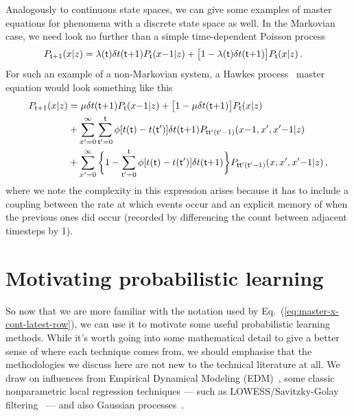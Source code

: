 Analogously to continuous state spaces, we can give some examples of master equations for phenomena with a discrete state space as well. In the Markovian case, we need look no further than a simple time-dependent Poisson process
\begin{align}
P_{{\sf t}+1}(x\vert z) &= \lambda ({\sf t}) \delta t({\sf t}{+}1)P_{{\sf t}}(x{-}1\vert z) + \big[1-\lambda ({\sf t}) \delta t({\sf t}{+}1)\big] P_{{\sf t}}(x\vert z) \,.
\end{align}
For such an example of a non-Markovian system, a Hawkes process~\cite{hawkes1971spectra} master equation would look something like this
\begin{align}
P_{{\sf t}+1}(x\vert z) &= \mu \delta t({\sf t}{+}1)P_{{\sf t}}(x{-}1\vert z) + \big[ 1-\mu \delta t({\sf t}{+}1)\big] P_{{\sf t}}(x\vert z) \nonumber \\
& + \sum_{x'=0}^\infty\sum_{{\sf t}'=0}^{{\sf t}} \phi [t({\sf t})-t({\sf t}')] \delta t({\sf t}{+}1)P_{{\sf t}{\sf t}'({\sf t}'-1)}(x{-}1,x',x'{-}1\vert z) \nonumber \\
&+ \sum_{x'=0}^\infty\bigg\lbrace 1-\sum_{{\sf t}'=0}^{{\sf t}} \phi [t({\sf t})-t({\sf t}')] \delta t({\sf t}{+}1)\bigg\rbrace P_{{\sf t}{\sf t}'({\sf t}'-1)}(x, x', x'{-}1\vert z) \,,
\end{align}
where we note the complexity in this expression arises because it has to include a coupling between the rate at which events occur and an explicit memory of when the previous ones did occur (recorded by differencing the count between adjacent timesteps by 1).

\section{\sffamily Motivating probabilistic learning}

So now that we are more familiar with the notation used by Eq.~(\ref{eq:master-x-cont-latest-row}), we can use it to motivate some useful probabilistic learning methods. While it's worth going into some mathematical detail to give a better sense of where each technique comes from, we should emphasise that the methodologies we discuss here are not new to the technical literature at all. We draw on influences from Empirical Dynamical Modeling (EDM)~\cite{sugihara1990nonlinear}, some classic nonparametric local regression techniques --- such as LOWESS/Savitzky-Golay filtering~\cite{savitzky1964smoothing} --- and also Gaussian processes~\cite{murphy2012machine}.  

